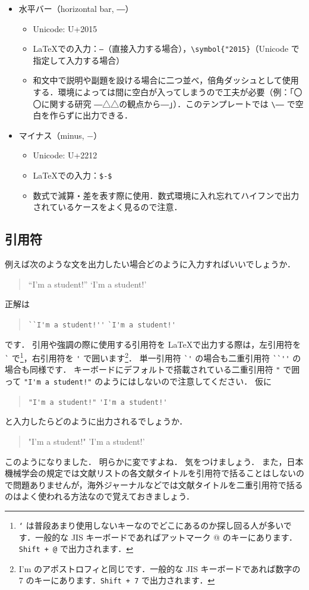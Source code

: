 \begin{itemize}
\begin{itemize}
    \end{itemize}
    \item 水平バー（horizontal bar, ―）
    \begin{itemize}
        \item Unicode: U+2015
        \item \LaTeX での入力：\verb|―|（直接入力する場合），\verb|\symbol{"2015}|（Unicode で指定して入力する場合）
        \item 和文中で説明や副題を設ける場合に二つ並べ，倍角ダッシュとして使用する．環境によっては間に空白が入ってしまうので工夫が必要（例：「〇〇に関する研究 \――△△の観点から\――」）．このテンプレートでは \verb|\――| で空白を作らずに出力できる．
    \end{itemize}
    \item マイナス（minus, $-$）
    \begin{itemize}
        \item Unicode: U+2212
        \item \LaTeX での入力：\verb|$-$|
        \item 数式で減算・差を表す際に使用．数式環境に入れ忘れてハイフンで出力されているケースをよく見るので注意．
    \end{itemize}
\end{itemize}

\subsection*{引用符}
\label{ssec:quotation}

例えば次のような文を出力したい場合どのように入力すればいいでしょうか．
\begin{quotation}
    ``I'm a student!'' \qquad `I'm a student!'
\end{quotation}
正解は
\begin{quotation}
    \verb|``I'm a student!''| \qquad \verb|`I'm a student!'|
\end{quotation}
です．
引用や強調の際に使用する引用符を \LaTeX で出力する際は，左引用符を \verb|`| で\footnote{\texttt{`} は普段あまり使用しないキーなのでどこにあるのか探し回る人が多いです．一般的な JIS キーボードであればアットマーク @ のキーにあります．\texttt{Shift + @} で出力されます．}，右引用符を \verb|'| で囲います\footnote{I'm のアポストロフィと同じです．一般的な JIS キーボードであれば数字の 7 のキーにあります．\texttt{Shift + 7} で出力されます．}．
単一引用符 \verb|`'| の場合も二重引用符 \verb|``''| の場合も同様です．
キーボードにデフォルトで搭載されている二重引用符 \verb|"| で囲って \verb|"I'm a student!"| のようにはしないので注意してください．
仮に
\begin{quotation}
    \verb|"I'm a student!"| \qquad \verb|'I'm a student!'|
\end{quotation}
と入力したらどのように出力されるでしょうか．
\begin{quotation}
    "I'm a student!" \qquad 'I'm a student!'
\end{quotation}
このようになりました．
明らかに変ですよね．
気をつけましょう．
また，日本機械学会の規定では文献リストの各文献タイトルを引用符で括ることはしないので問題ありませんが，海外ジャーナルなどでは文献タイトルを二重引用符で括るのはよく使われる方法なので覚えておきましょう．

